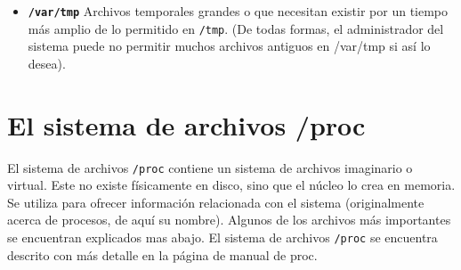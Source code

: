 \documentclass[12pt]{article}
\begin{document}
\begin{itemize}
	\item 
        
	\textbf{\texttt{/var/tmp}} 
	 Archivos temporales grandes o que necesitan existir por
	un tiempo más amplio de lo permitido en \texttt{/tmp}.  (De
	todas formas, el administrador del sistema puede no permitir muchos
	archivos antiguos en /var/tmp si así lo desea).  
	  \end{itemize}  


\section{ El sistema de archivos /proc}

El sistema de archivos \texttt{/proc} contiene un sistema de
archivos imaginario o virtual. Este no existe físicamente en disco, sino que el
núcleo lo crea en memoria. Se utiliza para ofrecer información relacionada con
el sistema (originalmente acerca de procesos, de aquí su nombre). Algunos de los
archivos más importantes se encuentran explicados mas abajo. El sistema de
archivos \texttt{/proc} se encuentra descrito con más detalle en la
página de manual de proc.
\end{document}
